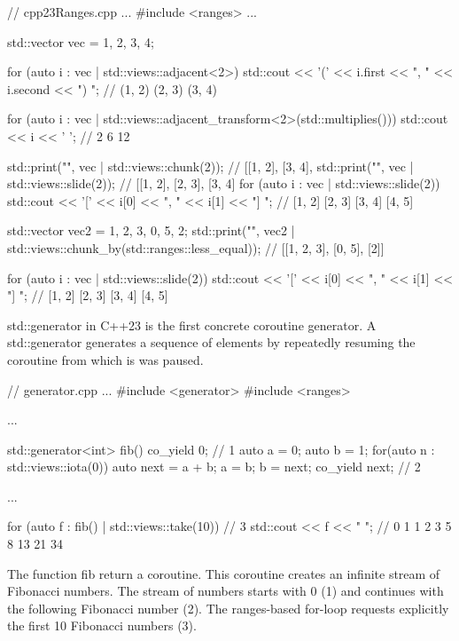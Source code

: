 \begin{cpp}
// cpp23Ranges.cpp
...
#include <ranges>
...

std::vector vec = {1, 2, 3, 4};

for (auto i : vec | std::views::adjacent<2>) {
	std::cout << '(' << i.first << ", " << i.second << ") "; // (1, 2) (2, 3) (3, 4)
}

for (auto i : vec | std::views::adjacent_transform<2>(std::multiplies())) {
	std::cout << i << ' '; // 2 6 12
}

std::print("{}\n", vec | std::views::chunk(2)); // [[1, 2], [3, 4],
std::print("{}\n", vec | std::views::slide(2)); // [[1, 2], [2, 3], [3, 4]
for (auto i : vec | std::views::slide(2)) {
	std::cout << '[' << i[0] << ", " << i[1] << "] "; // [1, 2] [2, 3] [3, 4] [4, 5]
}

std::vector vec2 = {1, 2, 3, 0, 5, 2};
std::print("{}\n", vec2 | std::views::chunk_by(std::ranges::less_equal{}));
														// [[1, 2, 3], [0, 5], [2]]

for (auto i : vec | std::views::slide(2)) {
	std::cout << '[' << i[0] << ", " << i[1] << "] "; // [1, 2] [2, 3] [3, 4] [4, 5]
}
\end{cpp}


std::generator in C++23 is the first concrete coroutine generator. A std::generator generates a sequence of elements by repeatedly resuming the coroutine from which is was paused.


\begin{cpp}
// generator.cpp
...
#include <generator>
#include <ranges>

...

std::generator<int> fib() {
	co_yield 0; // 1
	auto a = 0;
	auto b = 1;
	for(auto n : std::views::iota(0)) {
		auto next = a + b;
		a = b;
		b = next;
		co_yield next; // 2
	}
}

...

for (auto f : fib() | std::views::take(10)) { // 3
	std::cout << f << " "; // 0 1 1 2 3 5 8 13 21 34
}
\end{cpp}

The function fib return a coroutine. This coroutine creates an infinite stream of Fibonacci numbers. The stream of numbers starts with 0 (1) and continues with the following Fibonacci number (2). The ranges-based for-loop requests explicitly the first 10 Fibonacci numbers (3).





